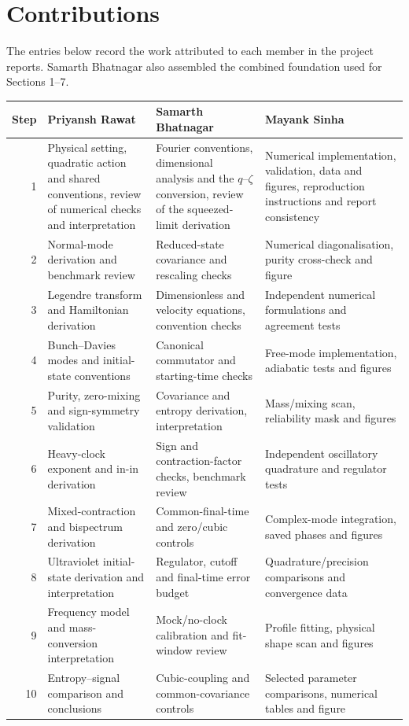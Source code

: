 \clearpage
\section*{Contributions}
The entries below record the work attributed to each member in the project reports. Samarth Bhatnagar also assembled the combined foundation used for Sections 1--7.
\par\smallskip
\begingroup\small\renewcommand{\arraystretch}{1.19}
\begin{tabularx}{\linewidth}{@{}r*{3}{>{\raggedright\arraybackslash}X}@{}}\toprule
Step & \textbf{Priyansh Rawat} & \textbf{Samarth Bhatnagar} & \textbf{Mayank Sinha}\\\midrule
1 & Physical setting, quadratic action and shared conventions, review of numerical checks and interpretation & Fourier conventions, dimensional analysis and the $q$--$\zeta$ conversion, review of the squeezed-limit derivation & Numerical implementation, validation, data and figures, reproduction instructions and report consistency \\[3pt]
2 & Normal-mode derivation and benchmark review & Reduced-state covariance and rescaling checks & Numerical diagonalisation, purity cross-check and figure \\[3pt]
3 & Legendre transform and Hamiltonian derivation & Dimensionless and velocity equations, convention checks & Independent numerical formulations and agreement tests \\[3pt]
4 & Bunch--Davies modes and initial-state conventions & Canonical commutator and starting-time checks & Free-mode implementation, adiabatic tests and figures \\[3pt]
5 & Purity, zero-mixing and sign-symmetry validation & Covariance and entropy derivation, interpretation & Mass/mixing scan, reliability mask and figures \\[3pt]
6 & Heavy-clock exponent and in-in derivation & Sign and contraction-factor checks, benchmark review & Independent oscillatory quadrature and regulator tests \\[3pt]
7 & Mixed-contraction and bispectrum derivation & Common-final-time and zero/cubic controls & Complex-mode integration, saved phases and figures \\[3pt]
8 & Ultraviolet initial-state derivation and interpretation & Regulator, cutoff and final-time error budget & Quadrature/precision comparisons and convergence data \\[3pt]
9 & Frequency model and mass-conversion interpretation & Mock/no-clock calibration and fit-window review & Profile fitting, physical shape scan and figures \\[3pt]
10 & Entropy--signal comparison and conclusions & Cubic-coupling and common-covariance controls & Selected parameter comparisons, numerical tables and figure \\[3pt]
\bottomrule\end{tabularx}\endgroup